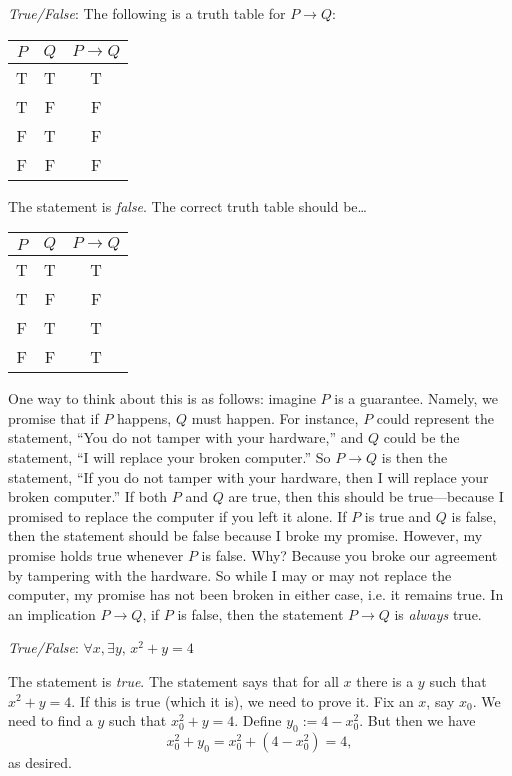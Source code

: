 \documentclass[11pt,letterpaper]{article}
\begin{document}
\thispagestyle{title}

\quizsol \textit{True/False}: The following is a truth table for $P \to Q$:
	\begin{table}[!ht]
	\centering
	\begin{tabular}{c|c||c}
	$P$ & $Q$ & $P \to Q$ \\ \hline
	T & T& T \\
	T & F & F \\
	F & T & F \\
	F & F & F
	\end{tabular}
	\end{table}

\sol The statement is \textit{false}. The correct truth table should be\dots
	\begin{table}[!ht]
	\centering
	\begin{tabular}{c|c||c}
	$P$ & $Q$ & $P \to Q$ \\ \hline
	T & T& T \\
	T & F & F \\
	F & T & T \\
	F & F & T
	\end{tabular}
	\end{table} \par
One way to think about this is as follows: imagine $P$ is a guarantee. Namely, we promise that if $P$ happens, $Q$ must happen. For instance, $P$ could represent the statement, ``You do not tamper with your hardware,'' and $Q$ could be the statement, ``I will replace your broken computer.'' So $P \to Q$ is then the statement, ``If you do not tamper with your hardware, then I will replace your broken computer.'' If both $P$ and $Q$ are true, then this should be true---because I promised to replace the computer if you left it alone. If $P$ is true and $Q$ is false, then the statement should be false because I broke my promise. However, my promise holds true whenever $P$ is false. Why? Because you broke our agreement by tampering with the hardware. So while I may or may not replace the computer, my promise has not been broken in either case, i.e. it remains true. In an implication $P \to Q$, if $P$ is false, then the statement $P \to Q$ is \textit{always} true. \pvspace{1.5cm}



\quizsol \textit{True/False}: $\forall x, \exists y, \, x^2 + y= 4$ \pspace

\sol The statement is \textit{true}. The statement says that for all $x$ there is a $y$ such that $x^2 + y= 4$. If this is true (which it is), we need to prove it. Fix an $x$, say $x_0$. We need to find a $y$ such that $x_0^2 + y = 4$. Define $y_0:= 4 - x_0^2$. But then we have 
	\[
	x_0^2 + y_0= x_0^2 + (4 - x_0^2)= 4,
	\]
as desired. 
\end{document}
